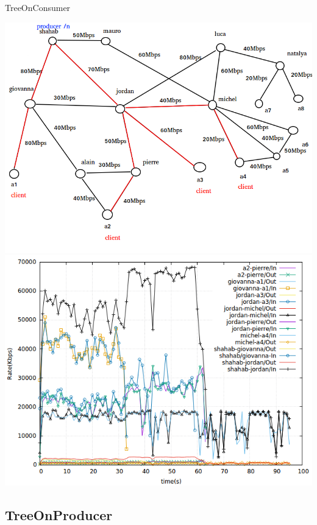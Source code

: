 \documentclass[8pt]{beamer}
\newcommand{\1}{\mathbbm 1}
\begin{document}
\begin{frame}{TreeOnConsumer}
{\includegraphics[scale=0.22]{figures/TreeOnConsumer_big.png} 
\includegraphics[scale=0.23]{figures/treeonconsumer_big.png} 

}

\end{frame}

\subsection{TreeOnProducer}
\end{document}
